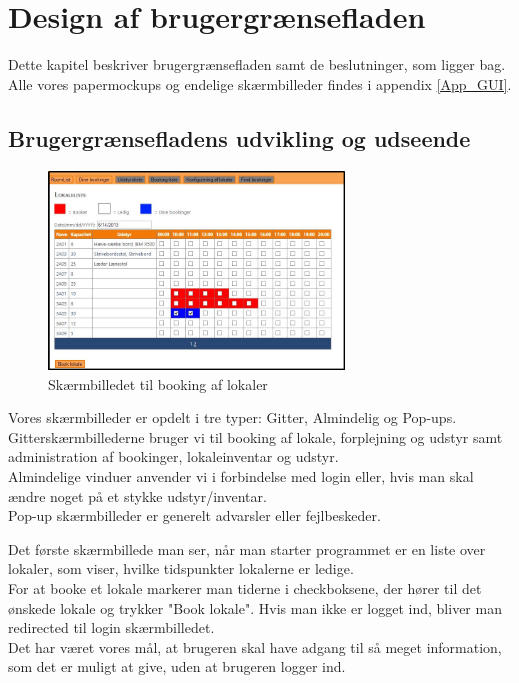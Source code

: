 \chapter{Design af brugergrænsefladen}
\label{Design_G}
Dette kapitel beskriver brugergrænsefladen samt de beslutninger, som ligger bag. Alle vores papermockups og endelige skærmbilleder findes i appendix \ref{App_GUI}.

\section{Brugergrænsefladens udvikling og udseende}
\label{Design_G_Development}
\begin{figure}[h!]
  \centering
    \includegraphics[width=0.7\textwidth]{Appendix/GUI-Prototype/DigitalMockup/GridEksempel}
  \caption{Skærmbilledet til booking af lokaler}
\label{Design_G_Development_FinalGrid}
\end{figure}

Vores skærmbilleder er opdelt i tre typer: Gitter, Almindelig og Pop-ups. 
\\Gitterskærmbillederne bruger vi til booking af lokale, forplejning og udstyr samt administration af bookinger, lokaleinventar og udstyr.
\\Almindelige vinduer anvender vi i forbindelse med login eller, hvis man skal ændre noget på et stykke udstyr/inventar.
\\Pop-up skærmbilleder er generelt advarsler eller fejlbeskeder.

Det første skærmbillede man ser, når man starter programmet er en liste over lokaler, som viser, hvilke tidspunkter lokalerne er ledige.
\\For at booke et lokale markerer man tiderne i checkboksene, der hører til det ønskede lokale og trykker "Book lokale". Hvis man ikke er logget ind, bliver man redirected til login skærmbilledet.
\\Det har været vores mål, at brugeren skal have adgang til så meget information, som det er muligt at give, uden at brugeren logger ind.

